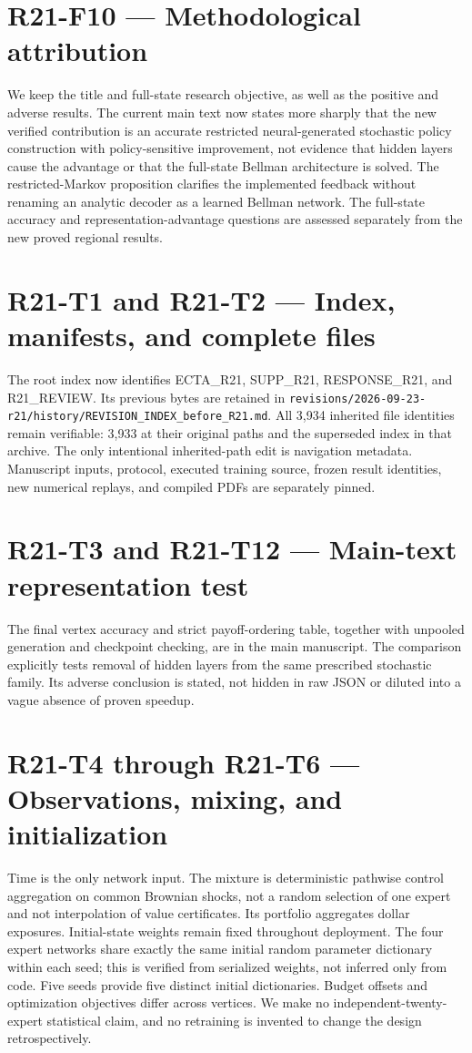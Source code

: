 \documentclass[ecta]{econsocart}
\theoremstyle{remark}
\begin{document}
\section{R21-F10 — Methodological attribution}
We keep the title and full-state research objective, as well as the positive and adverse results. The current main text now states more sharply that the new verified contribution is an accurate restricted neural-generated stochastic policy construction with policy-sensitive improvement, not evidence that hidden layers cause the advantage or that the full-state Bellman architecture is solved. The restricted-Markov proposition clarifies the implemented feedback without renaming an analytic decoder as a learned Bellman network. The full-state accuracy and representation-advantage questions are assessed separately from the new proved regional results.

\section{R21-T1 and R21-T2 — Index, manifests, and complete files}
The root index now identifies ECTA\_R21, SUPP\_R21, RESPONSE\_R21, and R21\_REVIEW. Its previous bytes are retained in \nolinkurl{revisions/2026-09-23-r21/history/REVISION_INDEX_before_R21.md}. All 3,934 inherited file identities remain verifiable: 3,933 at their original paths and the superseded index in that archive. The only intentional inherited-path edit is navigation metadata. Manuscript inputs, protocol, executed training source, frozen result identities, new numerical replays, and compiled PDFs are separately pinned.

\section{R21-T3 and R21-T12 — Main-text representation test}
The final vertex accuracy and strict payoff-ordering table, together with unpooled generation and checkpoint checking, are in the main manuscript. The comparison explicitly tests removal of hidden layers from the same prescribed stochastic family. Its adverse conclusion is stated, not hidden in raw JSON or diluted into a vague absence of proven speedup.

\section{R21-T4 through R21-T6 — Observations, mixing, and initialization}
Time is the only network input. The mixture is deterministic pathwise control aggregation on common Brownian shocks, not a random selection of one expert and not interpolation of value certificates. Its portfolio aggregates dollar exposures. Initial-state weights remain fixed throughout deployment. The four expert networks share exactly the same initial random parameter dictionary within each seed; this is verified from serialized weights, not inferred only from code. Five seeds provide five distinct initial dictionaries. Budget offsets and optimization objectives differ across vertices. We make no independent-twenty-expert statistical claim, and no retraining is invented to change the design retrospectively.
\end{document}

